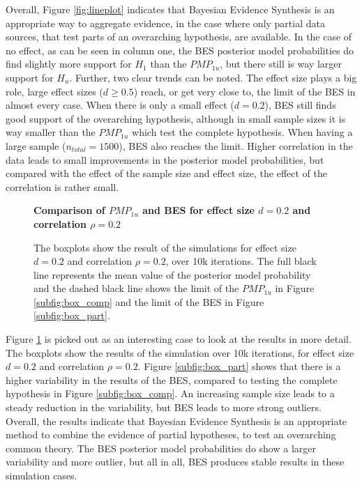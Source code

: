 \documentclass[12pt]{article}
\begin{document}
Overall, Figure \ref{fig:lineplot} indicates that Bayesian Evidence Synthesis is an appropriate way to aggregate evidence, in the case where only partial data sources, that test parts of an overarching hypothesis, are available. In the case of no effect, as can be seen in column one, the BES posterior model probabilities do find slightly more support for $H_1$ than the $PMP_{1u}$, but there still is way larger support for $H_u$. Further, two clear trends can be noted. The effect size plays a big role, large effect sizes ($d \geq 0.5$) reach, or get very close to, the limit of the BES in almost every case. When there is only a small effect ($d = 0.2$), BES still finds good support of the overarching hypothesis, although in small sample sizes it is way smaller than the $PMP_{1u}$ which test the complete hypothesis. When having a large sample ($n_{total} = 1500$), BES also reaches the limit. Higher correlation in the data leads to small improvements in the posterior model probabilities, but compared with the effect of the sample size and effect size, the effect of the correlation is rather small. \\
\begin{figure}[htbp]
    \centering
    \textbf{Comparison of $PMP_{1u}$ and BES for effect size $d = 0.2$ and correlation $\rho = 0.2$} 
    \vspace{0.5em}
    \hfill
    \caption{The boxplots show the result of the simulations for effect size $d = 0.2$ and correlation $\rho = 0.2$, over 10k iterations. The full black line represents the mean value of the posterior model probability and the dashed black line shows the limit of the $PMP_{1u}$ in Figure \ref{subfig:box_comp} and the limit of the BES in Figure \ref{subfig:box_part}.}
    \label{fig:boxplots}
\end{figure}
Figure \ref{fig:boxplots} is picked out as an interesting case to look at the results in more detail. The boxplots show the results of the simulation over 10k iterations, for effect size $d = 0.2$ and correlation $\rho = 0.2$. Figure \ref{subfig:box_part} shows that there is a higher variability in the results of the BES, compared to testing the complete hypothesis in Figure \ref{subfig:box_comp}. An increasing sample size leads to a steady reduction in the variability, but BES leads to more strong outliers. Overall, the results indicate that Bayesian Evidence Synthesis is an appropriate method to combine the evidence of partial hypotheses, to test an overarching common theory. The BES posterior model probabilities do show a larger variability and more outlier, but all in all, BES produces stable results in these simulation cases. \\
\end{document}
